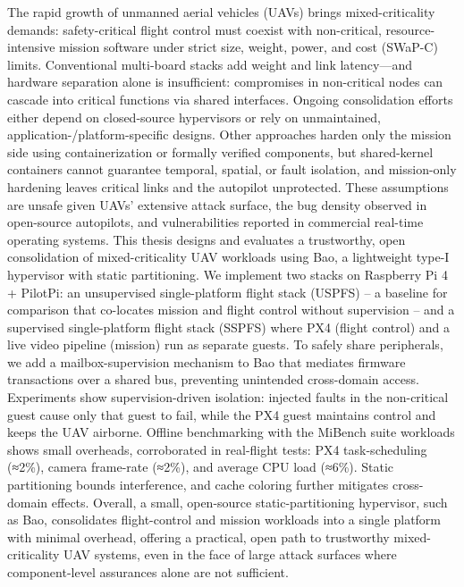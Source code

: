 The rapid growth of unmanned aerial vehicles (UAVs) brings mixed-criticality
demands: safety-critical flight control must coexist with non-critical,
resource-intensive mission software under strict size, weight, power, and cost
(SWaP-C) limits. Conventional multi-board stacks add weight and link latency—and
hardware separation alone is insufficient: compromises in non-critical nodes can
cascade into critical functions via shared interfaces. Ongoing consolidation
efforts either depend on closed-source hypervisors
or rely on unmaintained, application-/platform-specific designs.
Other
approaches harden only the mission side using containerization
or formally verified components,
but shared-kernel containers
cannot guarantee temporal, spatial, or fault isolation, and mission-only
hardening leaves critical links and the autopilot unprotected. These assumptions
are unsafe given UAVs' extensive attack surface, the bug density observed in
open-source autopilots, and vulnerabilities reported in commercial real-time
operating systems.
%
This thesis designs and evaluates a trustworthy, open consolidation of
mixed-criticality UAV workloads using Bao, a lightweight type-I hypervisor with
static partitioning. We implement two stacks on Raspberry Pi 4 + PilotPi: an
unsupervised single-platform flight stack (USPFS) -- a baseline for comparison
that co-locates mission and flight control without supervision -- and a
supervised single-platform flight stack (SSPFS) where PX4 (flight control) and a
live video pipeline (mission) run as separate guests. To safely share peripherals, we add a
mailbox-supervision mechanism to Bao that mediates firmware transactions over a
shared bus, preventing unintended cross-domain access.
%
Experiments show supervision-driven isolation: injected faults in the
non-critical guest cause only that guest to fail, while the PX4 guest maintains
control and keeps the UAV airborne. Offline benchmarking with the MiBench suite
workloads shows small overheads, corroborated in real-flight tests: PX4
task-scheduling (≈2\%), camera frame-rate (≈2\%), and average
CPU load (≈6\%). Static partitioning bounds interference, and cache
coloring further mitigates cross-domain effects.
%
Overall, a small, open-source static-partitioning hypervisor, such as Bao,
consolidates flight-control and mission workloads into a single platform with
minimal overhead, offering a practical, open path to trustworthy
mixed-criticality UAV systems, even in the face of large attack surfaces where
component-level assurances alone are not sufficient.



